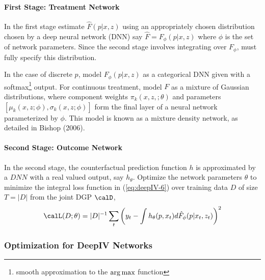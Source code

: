 \paragraph{First Stage: Treatment Network}

In the first stage estimate $\hat{F}(p|x,z)$ using an appropriately chosen distribution chosen by a deep neural network (DNN) say $\hat{F} = F_\phi(p|x,z)$ where $\phi$ is the set of network parameters. Since the second stage involves integrating over $F_\phi$, must fully specify this distribution. 

In the case of discrete $p$, model $F_\phi(p|x,z)$ as a categorical DNN given with a softmax\footnote{smooth approximation to the $\operatorname{arg\,max}$ function} output. For continuous treatment, model $F$ as a mixture of Gaussian distributions, where component weights $\pi_k(x,z,;\theta)$ and parameters $[\mu_k(x,z;\phi),\sigma_k(x,z;\phi)]$ form the final layer of a neural network parameterized by $\phi$. This model is known as a mixture density network, as detailed in Bishop (2006). 


\paragraph{Second Stage: Outcome Network}

In the second stage, the counterfactual prediction function $h$ is approximated by a $DNN$ with a real valued output, say $h_\theta$. Optimize the network parameters $\theta$ to minimize the integral loss function in (\ref{eq:deepIV-6}) over training data $D$ of size $T = |D|$ from the joint DGP $\calD$,
\begin{equation}
	\label{eq:deepIV-7}
	\calL(D;\theta) = |D|^{-1}\sum_t\left(y_t - \int h_\theta(p,x_t) d\hat{F}_\phi(p|x_t,z_t)\right)^2
\end{equation}


\subsubsection{Optimization for DeepIV Networks}

